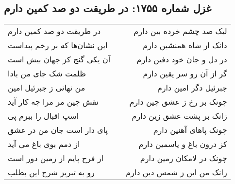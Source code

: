 \begin{center}
\section*{غزل شماره ۱۷۵۵: در طریقت دو صد کمین دارم}
\label{sec:1755}
\begin{longtable}{l p{0.5cm} r}
در طریقت دو صد کمین دارم
&&
لیک صد چشم خرده بین دارم
\\
این نشان‌ها که بر رخم پیداست
&&
دانک از شاه همنشین دارم
\\
آن یکی گنج کز جهان بیش است
&&
در دل و جان خود دفین دارم
\\
ظلمت شک جای من بادا
&&
گر از آن رو سر یقین دارم
\\
من نهانی ز جبرئیل امین
&&
جبرئیل دگر امین دارم
\\
نقش چین مر مرا چه کار آید
&&
چونک بر رخ ز عشق چین دارم
\\
اسپ اقبال را ببرم پی
&&
زانک بر پشت عشق زین دارم
\\
پای دار است جان من در عشق
&&
چونک پاهای آهنین دارم
\\
از دمم بوی باغ می آید
&&
کز درون باغ و یاسمین دارم
\\
از فرح پایم از زمین دور است
&&
چونک در لامکان زمین دارم
\\
رو به تبریز شرح این بطلب
&&
زانک من این ز شمس دین دارم
\\
\end{longtable}
\end{center}
